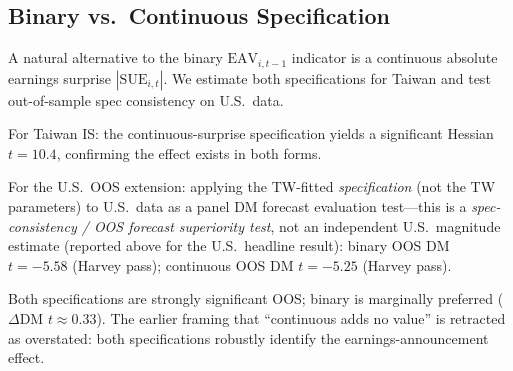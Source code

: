 \documentclass[12pt,a4paper]{article}
\begin{document}
\subsection{Binary vs.\ Continuous Specification}
\label{sec:spec}

A natural alternative to the binary $\mathrm{EAV}_{i,t-1}$ indicator is
a continuous absolute earnings surprise $|\mathrm{SUE}_{i,t}|$.
We estimate both specifications for Taiwan and test
out-of-sample spec consistency on U.S.\ data.

For Taiwan IS: the continuous-surprise specification yields a significant
Hessian $t = 10.4$, confirming the effect exists in both forms.

For the U.S.\ OOS extension: applying the TW-fitted \emph{specification}
(not the TW parameters) to U.S.\ data as a panel DM forecast evaluation
test---this is a \emph{spec-consistency / OOS forecast superiority test},
not an independent U.S.\ magnitude estimate (reported above for the U.S.\ headline result):
binary OOS DM $t = -5.58$ (Harvey pass); continuous OOS DM $t = -5.25$
(Harvey pass).

Both specifications are strongly significant OOS; binary is marginally
preferred ($\Delta$DM $t \approx 0.33$). The earlier framing that
``continuous adds no value'' is retracted as overstated: both specifications
robustly identify the earnings-announcement effect.

\end{document}

